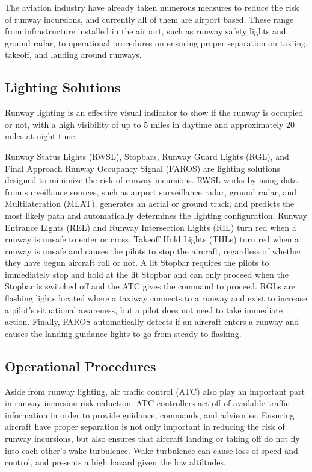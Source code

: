 The aviation industry have already taken numerous measures to reduce the risk of runway incursions, and currently all of them are airport based. These range from infrastructure installed in the airport, such as runway safety lights and ground radar, to operational procedures on ensuring proper separation on taxiing, takeoff, and landing around runways.

\subsection{Lighting Solutions}

Runway lighting is an effective visual indicator to show if the runway is occupied or not, with a high visibility of up to 5 miles in daytime and approximately 20 miles at night-time.

Runway Status Lights (RWSL), Stopbars, Runway Guard Lights (RGL), and Final Approach Runway Occupancy Signal (FAROS) are lighting solutions designed to minimize the risk of runway incursions. RWSL works by using data from surveillance sources, such as airport surveillance radar, ground radar, and Multilateration (MLAT), generates an aerial or ground track, and predicts the most likely path and automatically determines the lighting configuration. Runway Entrance Lights (REL) and Runway Intersection Lights (RIL) turn red when a runway is unsafe to enter or cross, Takeoff Hold Lights (THLs) turn red when a runway is unsafe and causes the pilots to stop the aircraft, regardless of whether they have begun aircraft roll or not. A lit Stopbar requires the pilots to immediately stop and hold at the lit Stopbar and can only proceed when the Stopbar is switched off and the ATC gives the command to proceed. RGLs are flashing lights located where a taxiway connects to a runway and exist to increase a pilot's situational awareness, but a pilot does not need to take immediate action. Finally, FAROS automatically detects if an aircraft enters a runway and causes the landing guidance lights to go from steady to flashing.

\subsection{Operational Procedures}

Aside from runway lighting, air traffic control (ATC) also play an important part in runway incursion risk reduction. ATC controllers act off of available traffic information in order to provide guidance, commands, and advisories. Ensuring aircraft have proper separation is not only important in reducing the risk of runway incursions, but also ensures that aircraft landing or taking off do not fly into each other's wake turbulence. Wake turbulence can cause loss of speed and control, and presents a high hazard given the low altiltudes.

